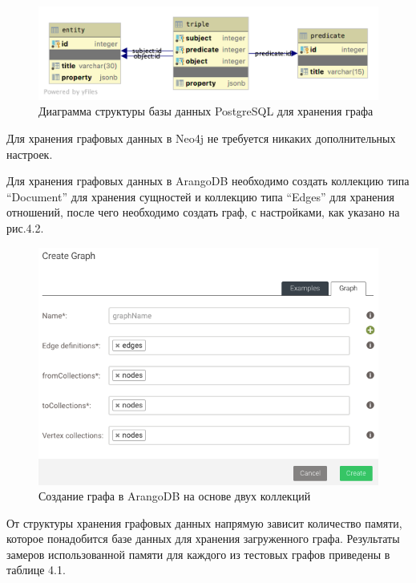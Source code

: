 \begin{figure}[ht!]
    \center
    \includegraphics [scale=0.35] {my_folder/myimg//8}
    \caption{Диаграмма структуры базы данных PostgreSQL для хранения графа}
\end{figure}

Для хранения графовых данных в Neo4j не требуется никаких дополнительных настроек.

Для хранения графовых данных в ArangoDB необходимо создать коллекцию типа “Document” для хранения сущностей и коллекцию типа “Edges” для
хранения отношений, после чего необходимо создать граф, с настройками, как указано на рис.4.2.

\begin{figure}[ht!]
    \center
    \includegraphics [scale=0.5] {my_folder/myimg//9}
    \caption{Создание графа в ArangoDB на основе двух коллекций}
\end{figure}

От структуры хранения графовых данных напрямую зависит количество памяти, которое понадобится базе данных для хранения загруженного графа.
Результаты замеров использованной памяти для каждого из тестовых графов приведены в таблице 4.1.

